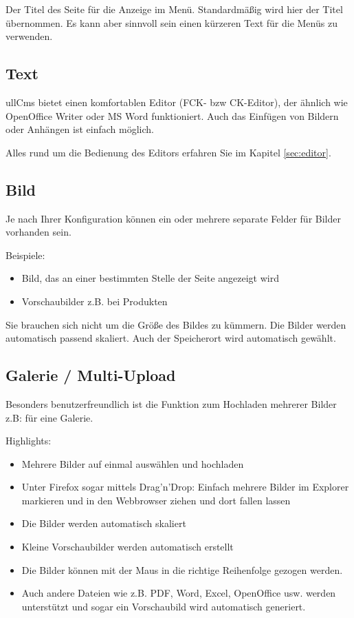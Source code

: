 \documentclass[article, a4paper, oneside, 11pt]{memoir}
\begin{document}
Der Titel des Seite für die Anzeige im Menü. Standardmäßig wird hier der Titel übernommen. Es kann aber sinnvoll sein einen kürzeren Text für die Menüs zu verwenden.

\subsection{Text}

ullCms bietet einen komfortablen
Editor (FCK- bzw CK-Editor), der ähnlich wie OpenOffice Writer oder MS Word funktioniert.
Auch das Einfügen von Bildern oder Anhängen ist einfach möglich. 

Alles rund um die Bedienung des Editors erfahren Sie im Kapitel \vref{sec:editor}.

\subsection{Bild}

Je nach Ihrer Konfiguration können ein oder mehrere separate Felder für Bilder vorhanden sein.

Beispiele:

\begin{itemize}
\item Bild, das an einer bestimmten Stelle der Seite angezeigt wird
\item Vorschaubilder z.B. bei Produkten
\end{itemize}

Sie brauchen sich nicht um die Größe des Bildes zu kümmern. Die Bilder werden automatisch passend skaliert.
Auch der Speicherort wird automatisch gewählt.

\subsection{Galerie / Multi-Upload}
\label{sec:gallery}

Besonders benutzerfreundlich ist die Funktion zum Hochladen mehrerer Bilder z.B: für eine Galerie.

Highlights:
\begin{itemize}
\item Mehrere Bilder auf einmal auswählen und hochladen
\item Unter Firefox sogar mittels Drag'n'Drop: Einfach mehrere Bilder im Explorer markieren und in den Webbrowser ziehen und dort fallen lassen
\item Die Bilder werden automatisch skaliert
\item Kleine Vorschaubilder werden automatisch erstellt
\item Die Bilder können mit der Maus in die richtige Reihenfolge gezogen werden.
\item Auch andere Dateien wie z.B. PDF, Word, Excel, OpenOffice usw. werden unterstützt und sogar ein Vorschaubild wird automatisch generiert.
\end{itemize}
\end{document}
